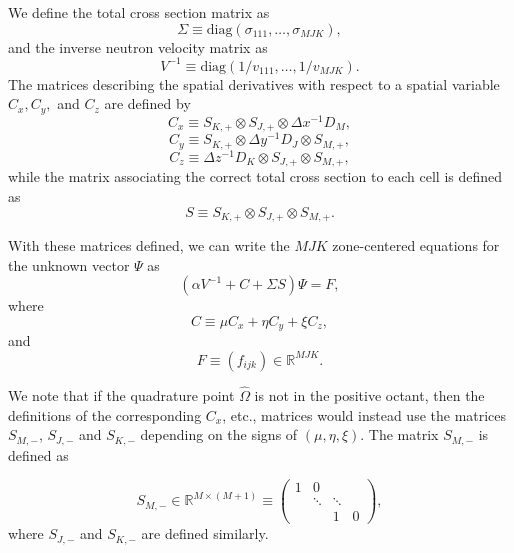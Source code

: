 We define the total cross section matrix as
\begin{equation}
	\Sigma \equiv \text{diag}(\sigma_{111}, \dots, \sigma_{MJK}),
\end{equation}
and the inverse neutron velocity matrix as 
\begin{equation}
	V^{-1} \equiv \text{diag}(1/v_{111}, \dots, 1/v_{MJK}).
\end{equation}
The matrices describing the spatial derivatives with respect to a spatial variable $C_{x}, C_{y},$ and $C_{z}$ are defined by
\begin{equation}
	C_{x} \equiv S_{K,+} \otimes S_{J,+} \otimes \Delta x^{-1} D_{M},
\end{equation}
\begin{equation}
	C_{y} \equiv S_{K,+} \otimes \Delta y^{-1} D_{J} \otimes S_{M,+},
\end{equation}
\begin{equation}
	C_{z} \equiv \Delta z^{-1} D_{K} \otimes S_{J,+} \otimes S_{M,+},
\end{equation}
while the matrix associating the correct total cross section to each cell is defined as
\begin{equation}
	S \equiv S_{K,+} \otimes S_{J,+} \otimes S_{M,+}.
\end{equation}

With these matrices defined, we can write the $MJK$ zone-centered equations for the unknown vector $\Psi$ as
\begin{equation}
	(\alpha V^{-1} + C + \Sigma S) \Psi = F,
	\label{eq:Disc}
\end{equation}
where
\begin{equation}
	C \equiv \mu C_{x} + \eta C_{y} + \xi C_{z},
\end{equation}
and 
\begin{equation}
F \equiv (f_{ijk}) \in \mathbb{R}^{MJK}.
\end{equation}

We note that if the quadrature point $\hat{\Omega}$ is not in the positive octant, then the definitions of the corresponding $C_{x}$, etc., matrices would instead use the matrices $S_{M,-}$, $S_{J,-}$ and $S_{K,-}$ depending on the signs of $(\mu, \eta, \xi)$. The matrix $S_{M,-}$ is defined as

\begin{equation}
S_{M,-} \in \mathbb{R}^{M \times (M+1)} \equiv \begin{pmatrix}
			1 & 0 & &  \\
			& \ddots & \ddots  & \\
			& & 1 & 0
			\end{pmatrix},
\end{equation}
where $S_{J,-}$ and $S_{K,-}$ are defined similarly.

